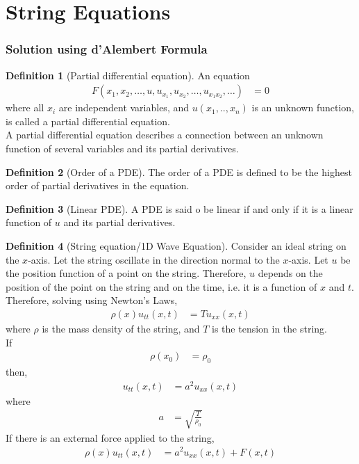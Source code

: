 \documentclass[titlepage, fleqn, a4paper, 12pt, twoside]{article}
\theoremstyle{definition}
\newtheorem{definition}{Definition}
\theoremstyle{theorem}
\begin{document}
\clearpage
{}

\part{String Equations}

\section{Solution using d'Alembert Formula}

\begin{definition}[Partial differential equation]
	An equation
	\begin{align*}
		F(x_1,x_2,\dots,u,u_{x_1},u_{x_2},\dots,u_{x_1 x_2},\dots) & = 0
	\end{align*}
	where all $x_i$ are independent variables, and $u(x_1,..,x_n)$ is an unknown function, is called a partial differential equation.\\
	A partial differential equation describes a connection between an unknown function of several variables and its partial derivatives.
\end{definition}

\begin{definition}[Order of a PDE]
	The order of a PDE is defined to be the highest order of partial derivatives in the equation.
\end{definition}

\begin{definition}[Linear PDE]
	A PDE is said o be linear if and only if it is a linear function of $u$ and its partial derivatives.
\end{definition}

\begin{definition}[String equation/1D Wave Equation]
	Consider an ideal string on the $x$-axis.
	Let the string oscillate in the direction normal to the $x$-axis.
	Let $u$ be the position function of a point on the string.
	Therefore, $u$ depends on the position of the point on the string and on the time, i.e. it is a function of $x$ and $t$.\\
	Therefore, solving using Newton's Laws,
	\begin{align*}
		\rho(x) u_{t t}(x,t) & = T u_{x x}(x,t)
	\end{align*}
	where $\rho$ is the mass density of the string, and $T$ is the tension in the string.\\
	If
	\begin{align*}
		\rho(x_0) & = \rho_0
	\end{align*}
	then,
	\begin{align*}
		u_{t t}(x,t) & = a^2 u_{x x}(x,t)
	\end{align*}
	where
	\begin{align*}
		a & = \sqrt{\frac{T}{\rho_0}}
	\end{align*}
	If there is an external force applied to the string,
	\begin{align*}
		\rho(x) u_{t t}(x,t) & = a^2 u_{x x}(x,t) + F(x,t)
	\end{align*}
\end{definition}
\end{document}
